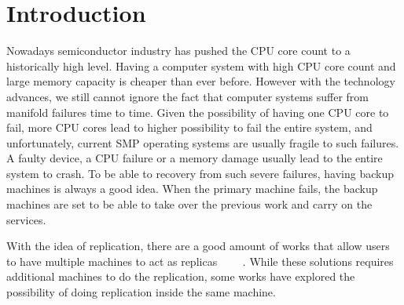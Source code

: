 \chapter{Introduction}





Nowadays semiconductor industry has pushed the CPU core count to a historically high level. Having a computer system with high CPU core count and large memory capacity is cheaper than ever before. However with the technology advances, we still cannot ignore the fact that computer systems suffer from manifold failures time to time. Given the possibility of having one CPU core to fail, more CPU cores lead to higher possibility to fail the entire system, and unfortunately, current SMP operating systems are usually fragile to such failures. A faulty device, a CPU failure or a memory damage usually lead to the entire system to crash. To be able to recovery from such severe failures, having backup machines is always a good idea. When the primary machine fails, the backup machines are set to be able to take over the previous work and carry on the services.

With the idea of replication, there are a good amount of works that allow users to have multiple machines to act as replicas ~\cite{cui2015p}~\cite{zagorodnov2009practical}~\cite{singh2009zeno}~\cite{mao2008mencius}. While these solutions requires additional machines to do the replication, some works have explored the possibility of doing replication inside the same machine. 

